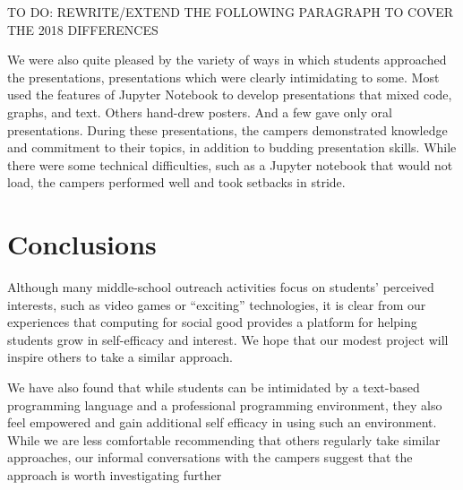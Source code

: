 TO DO: REWRITE/EXTEND THE FOLLOWING PARAGRAPH TO COVER THE 2018 DIFFERENCES

We were also quite pleased by the variety of ways in which students
approached the presentations, presentations which were clearly
intimidating to some.  Most used the features of Jupyter Notebook
to develop presentations that mixed code, graphs, and text.  Others
hand-drew posters.  And a few gave only oral presentations.  During
these presentations, the campers demonstrated knowledge and commitment
to their topics, in addition to budding presentation skills. While
there were some technical difficulties, such as a Jupyter notebook
that would not load, the campers performed well and took setbacks
in stride.

\section{Conclusions}

Although many middle-school outreach activities focus on students'
perceived interests, such as video games or ``exciting'' technologies,
it is clear from our experiences that computing for social good
provides a platform for helping students grow in self-efficacy and
interest.  We hope that our modest project will inspire others to
take a similar approach.

We have also found that while students can be intimidated by a text-based
programming language and a professional programming environment, they also
feel empowered and gain additional self efficacy in using such an environment.
While we are less comfortable recommending that others regularly take similar
approaches, our informal conversations with the campers suggest that the
approach is worth investigating further
